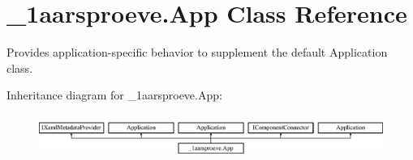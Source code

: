\hypertarget{class__1aarsproeve_1_1_app}{}\section{\+\_\+1aarsproeve.\+App Class Reference}
\label{class__1aarsproeve_1_1_app}


Provides application-\/specific behavior to supplement the default Application class.  


Inheritance diagram for \+\_\+1aarsproeve.\+App\+:\begin{figure}[H]
\begin{center}
\leavevmode
\includegraphics[height=1.473684cm]{class__1aarsproeve_1_1_app}
\end{center}
\end{figure}
